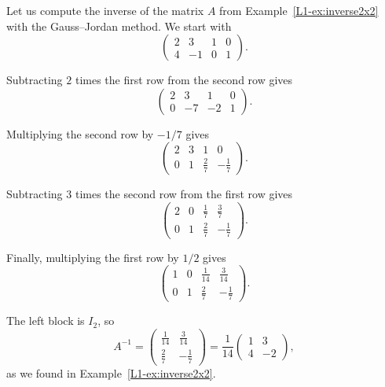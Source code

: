 \begin{example}
    Let us compute the inverse of the matrix $A$ from Example~\ref{L1-ex:inverse2x2} with the Gauss--Jordan method. We start with
    \[\left(\begin{array}{cc|cc}
        2 & 3 & 1 & 0 \\
        4 & -1 & 0 & 1
    \end{array}\right).\]

    Subtracting $2$ times the first row from the second row gives
    \[\left(\begin{array}{cc|cc}
        2 & 3 & 1 & 0 \\
        0 & -7 & -2 & 1
    \end{array}\right).\]

    Multiplying the second row by $-1/7$ gives
    \[\left(\begin{array}{cc|cc}
        2 & 3 & 1 & 0 \\
        0 & 1 & \frac{2}{7} & -\frac{1}{7}
    \end{array}\right).\]

    Subtracting $3$ times the second row from the first row gives
    \[\left(\begin{array}{cc|cc}
        2 & 0 & \frac{1}{7} & \frac{3}{7} \\
        0 & 1 & \frac{2}{7} & -\frac{1}{7}
    \end{array}\right).\]

    Finally, multiplying the first row by $1/2$ gives
    \[\left(\begin{array}{cc|cc}
        1 & 0 & \frac{1}{14} & \frac{3}{14} \\
        0 & 1 & \frac{2}{7} & -\frac{1}{7}
    \end{array}\right).\]

    The left block is $I_2$, so
    \[A^{-1} = \begin{pmatrix}
        \frac{1}{14} & \frac{3}{14} \\
        \frac{2}{7} & -\frac{1}{7}
    \end{pmatrix} = \frac{1}{14} \begin{pmatrix}
        1 & 3 \\
        4 & -2
    \end{pmatrix},\]
    as we found in Example~\ref{L1-ex:inverse2x2}.
\end{example}

